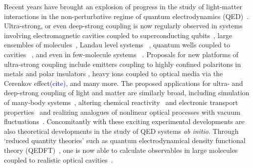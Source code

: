 \documentclass[aps,prl,twocolumn,
	groupedaddress,superscriptaddress,
	amsfonts,amssymb,amsmath,floatfix,
	citeautoscript]{revtex4-1}
\newcommand{\Jadd}[1]{\textcolor{blue}{#1}}
\begin{document}
 Recent years have brought an explosion of progress in the study of light-matter interactions in the non-perturbative regime of quantum electrodynamics (QED)~\cite{flick7strong,ruggenthaler2017b,forn2018ultrastrong}. Ultra-strong, or even deep-strong coupling is now regularly observed in systems involving electromagnetic cavities coupled to superconducting qubits~\cite{blais2004,wallraff2004,yoshihara2017superconducting,forn2017ultrastrong}, large ensembles of molecules~\cite{hutchison2012,coles2014,coles2014b,shalabney2015coherent, thomas2016,ebbesen2016,thomas2018}, Landau level systems ~\cite{scalari2012ultrastrong,zhang2016collective},  quantum wells coupled to cavities ~\cite{todorov2010ultrastrong,geiser2012ultrastrong}, and even in few-molecule systems ~\cite{benz2016,chikkaraddy2016}. Proposals for new platforms of ultra-strong coupling include emitters coupling to highly confined polaritons in metals and polar insulators \cite{rivera2016shrinking}, heavy ions coupled to optical media via the Cerenkov effect\Jadd{(cite)}, and many more. The proposed applications for ultra- and deep-strong coupling of light and matter are similarly broad, including simulation of many-body systems~\cite{forn2018ultrastrong}, altering chemical reactivity~\cite{hutchison2012, thomas2016,thomas2018, flick2017, herrera2016,feist2017,martinez2017} and electronic transport properties~\cite{orgiu2015} and realizing analogues of nonlinear optical processes with vacuum fluctuations~\cite{kockum2017deterministic}. Concomitantly with these exciting experimental developments are also theoretical developments in the study of QED systems \textit{ab initio}. Through `reduced quantity theories' such as quantum electrodynamical density functional theory (QEDFT)~\cite{tokatly2013,ruggenthaler2014,flick2015,dimitrov2017,flick2018,flick2018b}, one is now able to calculate observables in large molecules coupled to realistic optical cavities~\cite{pellegrini2015,flick2017c}. 
\end{document}
